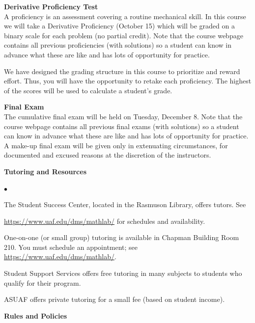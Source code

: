 \documentclass[12pt]{article}
\renewcommand{\emph}[1]{\textsf{\textbf{#1}}}
\newcommand{\localhead}[1]{\par\smallskip\textbf{#1}\nobreak\\}%
\def\heading#1{\localhead{\large\emph{#1}}}
\def\subheading#1{\localhead{\emph{#1}}}
\newenvironment{clist}%
{\bgroup\parskip 0pt\begin{list}{$\bullet$}{\partopsep 4pt\topsep 0pt\itemsep -2pt}}%
{\end{list}\egroup}%
\begin{document}
\pagebreak

\heading{Derivative Proficiency Test}
A proficiency is an assessment covering a routine mechanical skill.  In this course we will take a Derivative Proficiency (October 15) which will be graded on a binary scale for each problem (no partial credit). Note that the course webpage contains all previous proficiencies (with solutions) so a student can know in advance what these are like and has lots of opportunity for practice.

We have designed the grading structure in this course to prioritize and reward effort. Thus, you will have the opportunity to retake each proficiency. The highest of the scores will be used to calculate a student's grade. 

\heading{Final Exam} 
The cumulative final exam will be held on Tuesday, December 8. Note that the course webpage contains all previous final exams (with solutions) so a student can know in advance what these are like  and has lots of opportunity for practice. A make-up final exam will be given only in extenuating circumstances, for documented and excused reasons at the discretion of the instructors.

\heading{Tutoring and Resources}
\vskip -30pt\strut
\begin{clist}
	\item The Student Success Center, located in the Rasmuson Library, offers tutors. 
	See 

	\url{https://www.uaf.edu/dms/mathlab/} for schedules and availability.
	\item One-on-one (or small group) tutoring is available in 
Chapman Building Room 210. You must schedule an
appointment; see \url{https://www.uaf.edu/dms/mathlab/}.
	\item Student Support Services offers free tutoring in many subjects to students who qualify for their program.
	\item ASUAF offers private tutoring for a small fee (based on student income).
\end{clist}

\heading{Rules and Policies}
\vskip -20pt
\end{document}
